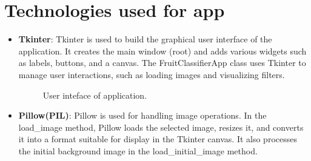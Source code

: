 \documentclass[a4paper,oneside,11pt]{book}
\begin{document}
\section{Technologies used for app}
\begin{itemize}
    \item \textbf{Tkinter}: Tkinter is used to build the graphical user interface of the application. It creates the main window (root) and adds various widgets such as labels, buttons, and a canvas. The FruitClassifierApp class uses Tkinter to manage user interactions, such as loading images and visualizing filters.
    \begin{figure}[H]
        \centering
        \caption{User inteface of application.}
    \end{figure}
    \item \textbf{Pillow(PIL)}: Pillow is used for handling image operations. In the load\_image method, Pillow loads the selected image, resizes it, and converts it into a format suitable for display in the Tkinter canvas. It also processes the initial background image in the load\_initial\_image method.

\end{itemize}
\end{document}
